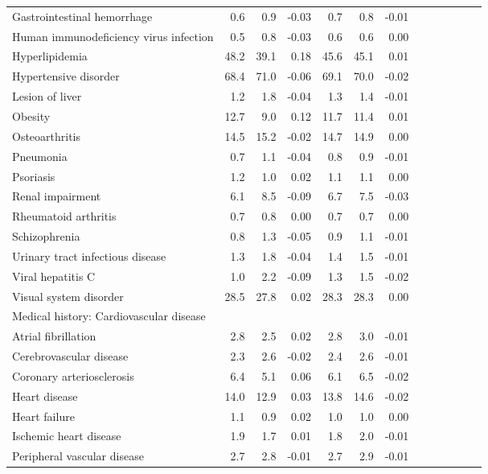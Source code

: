 \documentclass[11pt,]{article}
\begin{document}
\begin{longtable}{lrrrrrrrrrrrr}
      Gastrointestinal hemorrhage &  0.6 &  0.9 & -0.03 &  0.7 &  0.8 & -0.01 \\ 
      Human immunodeficiency virus infection &  0.5 &  0.8 & -0.03 &  0.6 &  0.6 &  0.00 \\ 
      Hyperlipidemia & 48.2 & 39.1 &  0.18 & 45.6 & 45.1 &  0.01 \\ 
      Hypertensive disorder & 68.4 & 71.0 & -0.06 & 69.1 & 70.0 & -0.02 \\ 
      Lesion of liver &  1.2 &  1.8 & -0.04 &  1.3 &  1.4 & -0.01 \\ 
      Obesity & 12.7 &  9.0 &  0.12 & 11.7 & 11.4 &  0.01 \\ 
      Osteoarthritis & 14.5 & 15.2 & -0.02 & 14.7 & 14.9 &  0.00 \\ 
      Pneumonia &  0.7 &  1.1 & -0.04 &  0.8 &  0.9 & -0.01 \\ 
      Psoriasis &  1.2 &  1.0 &  0.02 &  1.1 &  1.1 &  0.00 \\ 
      Renal impairment &  6.1 &  8.5 & -0.09 &  6.7 &  7.5 & -0.03 \\ 
      Rheumatoid arthritis &  0.7 &  0.8 &  0.00 &  0.7 &  0.7 &  0.00 \\ 
      Schizophrenia &  0.8 &  1.3 & -0.05 &  0.9 &  1.1 & -0.01 \\ 
      Urinary tract infectious disease &  1.3 &  1.8 & -0.04 &  1.4 &  1.5 & -0.01 \\ 
      Viral hepatitis C &  1.0 &  2.2 & -0.09 &  1.3 &  1.5 & -0.02 \\ 
      Visual system disorder & 28.5 & 27.8 &  0.02 & 28.3 & 28.3 &  0.00 \\ 
  Medical history: Cardiovascular disease &    &    &     &    &    &     \\ 
      Atrial fibrillation &  2.8 &  2.5 &  0.02 &  2.8 &  3.0 & -0.01 \\ 
      Cerebrovascular disease &  2.3 &  2.6 & -0.02 &  2.4 &  2.6 & -0.01 \\ 
      Coronary arteriosclerosis &  6.4 &  5.1 &  0.06 &  6.1 &  6.5 & -0.02 \\ 
      Heart disease & 14.0 & 12.9 &  0.03 & 13.8 & 14.6 & -0.02 \\ 
      Heart failure &  1.1 &  0.9 &  0.02 &  1.0 &  1.0 &  0.00 \\ 
      Ischemic heart disease &  1.9 &  1.7 &  0.01 &  1.8 &  2.0 & -0.01 \\ 
      Peripheral vascular disease &  2.7 &  2.8 & -0.01 &  2.7 &  2.9 & -0.01 \\ 

\end{longtable}
\end{document}

